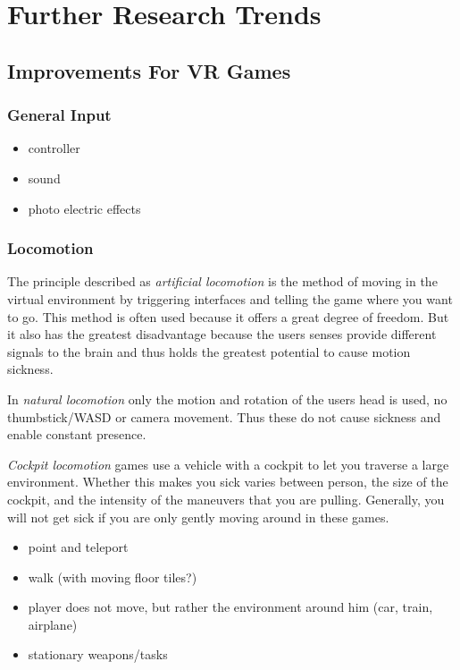 \section{Further Research Trends}
\subsection{Improvements For VR Games}
\subsubsection{General Input}

\begin{itemize}
	\item controller
	\item sound
	\item photo electric effects
\end{itemize}

\subsubsection{Locomotion}

The principle described as \textit{artificial locomotion} is the method of moving in the virtual environment by triggering interfaces and telling the game where you want to go. This method is often used because it offers a great degree of freedom. But it also has the greatest disadvantage because the users senses provide different signals to the brain and thus holds the greatest potential to cause motion sickness.

In \textit{natural locomotion} only the motion and rotation of the users head is used, no thumbstick/WASD or camera movement. Thus these do not cause sickness and enable constant presence.

\textit{Cockpit locomotion} games use a vehicle with a cockpit to let you traverse a large environment. Whether this makes you sick varies between person, the size of the cockpit, and the intensity of the maneuvers that you are pulling. Generally, you will not get sick if you are only gently moving around in these games. 

\begin{itemize}
	\item point and teleport
	\item walk (with moving floor tiles?)
	\item player does not move, but rather the environment around him (car, train, airplane)
	\item stationary weapons/tasks
\end{itemize}

